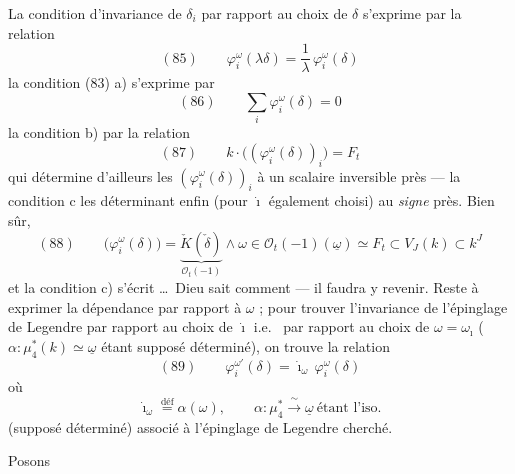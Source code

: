 \documentclass[11pt,a4paper]{article}
\begin{document}
La condition d'invariance de $\delta_i$ par rapport au choix de $\delta$
s'exprime par la relation
\[
  (85) \qquad \varphi_i^\omega(\lambda\delta) = \frac{1}{\lambda}\, \varphi_i^\omega(\delta)
\]
la condition (83) a) s'exprime par
\[
  (86) \qquad \sum_i \varphi_i^\omega(\delta) = 0
\]
la condition b) par la relation
\[
  (87) \qquad k \cdot \bigl((\varphi_i^\omega(\delta))_i\bigr) = F_t
\]
qui détermine d'ailleurs les $(\varphi_i^\omega(\delta))_i$ à un scalaire inversible
près --- la condition c les déterminant enfin (pour $\dot\imath$ également choisi)
au \emph{signe} près. Bien sûr, \struck{\ill{}} 
\[
  (88) \qquad \bigl(\varphi_i^\omega(\delta)\bigr) =
  \underbrace{\check K(\check\delta)}_{\mathcal{O}_t(-1)} \wedge \omega
  \in \mathcal{O}_t(-1)(\underline{\omega}) \simeq F_t \subset V_J(k) \subset k^J
\]
et la condition c) s'écrit \ldots\ Dieu sait comment --- il faudra \struck{\ill{}}
y revenir. Reste à exprimer la dépendance par rapport à $\omega$ ; pour
\struck{\ill{}} trouver l'invariance de l'épinglage de Legendre par rapport au
choix de $\dot\imath$ i.e.\ \struck{\ill{}} par rapport au choix de
$\omega = \omega_{\dot\imath}$ ($\alpha : \mu_4^*(k) \simeq \underline{\omega}$
étant supposé déterminé), on trouve la relation 
\[
  (89) \qquad \varphi_i^{\omega'}(\delta) = \dot\imath_\omega\, \varphi_i^\omega(\delta)
\]
où
\[
  \dot\imath_\omega \overset{\text{déf}}{=} \alpha(\omega) , \qquad
  \alpha : \mu_4^* \xrightarrow{\ \sim\ } \underline{\omega} \ \text{étant l'iso.}
\]
(supposé déterminé) associé à l'épinglage de Legendre cherché.

Posons
\end{document}
